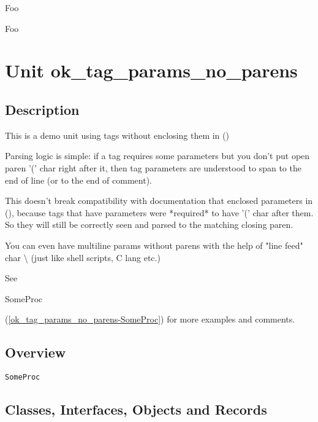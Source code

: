 \documentclass{report}
\newif\ifpdf
\begin{document}
\begin{ttfamily}Foo\end{ttfamily}

\begin{ttfamily}Foo\end{ttfamily}
\chapter{Unit ok{\_}tag{\_}params{\_}no{\_}parens}
\label{ok_tag_params_no_parens}
\section{Description}
This is a demo unit using tags without enclosing them in ()\hfill\vspace*{1ex}



Parsing logic is simple: if a tag requires some parameters but you don't put open paren '(' char right after it, then tag parameters are understood to span to the end of line (or to the end of comment).

This doesn't break compatibility with documentation that enclosed parameters in (), because tags that have parameters were *required* to have '(' char after them. So they will still be correctly seen and parsed to the matching closing paren.

You can even have multiline params without parens with the help of "line feed" char {\textbackslash} (just like shell scripts, C lang etc.)

See \begin{ttfamily}SomeProc\end{ttfamily}(\ref{ok_tag_params_no_parens-SomeProc}) for more examples and comments.

   
\section{Overview}
\begin{description}
\item[\texttt{\begin{ttfamily}EFoo\end{ttfamily} Class}]
\end{description}
\begin{description}
\item[\texttt{SomeProc}]
\end{description}
\section{Classes, Interfaces, Objects and Records}
\ifpdf
\end{document}
